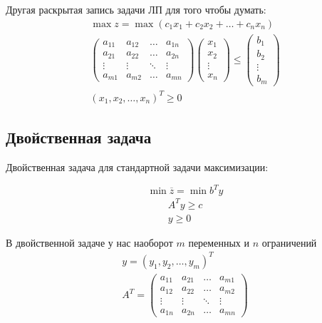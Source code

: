\documentclass[a4paper,article,14pt]{extarticle}
\begin{document}
Другая раскрытая запись задачи ЛП для того чтобы думать:
\begin{gather}
    \max z = \max (c_1x_1 + c_2x_2 + \ldots + c_nx_n) \\
    \begin{pmatrix}
        a_{11} & a_{12} & \ldots & a_{1n} \\
        a_{21} & a_{22} & \ldots & a_{2n} \\
        \vdots & \vdots & \ddots & \vdots \\
        a_{m1} & a_{m2} & \ldots & a_{mn}
    \end{pmatrix}
    \begin{pmatrix}
        x_1 \\ x_2 \\ \vdots \\ x_n
    \end{pmatrix}
    \le
    \begin{pmatrix}
        b_1 \\ b_2 \\ \vdots \\ b_m
    \end{pmatrix}
    \\
    (x_1, x_2, \ldots, x_n)^T \ge 0
\end{gather}

\subsection{Двойственная задача}

Двойственная задача для стандартной задачи максимизации:

\begin{equation}
    \min \overline z = \min b^Ty
\end{equation}
\begin{gather}
    A^Ty \ge c \\
    y \ge 0
\end{gather}

В двойственной задаче у нас наоборот \(m\) переменных и \(n\) ограничений
\begin{gather}
    y = (y_1, y_2, \ldots, y_m)^T \\
    A^T =
    \begin{pmatrix}
        a_{11} & a_{21} & \ldots & a_{m1} \\
        a_{12} & a_{22} & \ldots & a_{m2} \\
        \vdots & \vdots & \ddots & \vdots \\
        a_{1n} & a_{2n} & \ldots & a_{mn}
    \end{pmatrix}
\end{gather}
\end{document}
